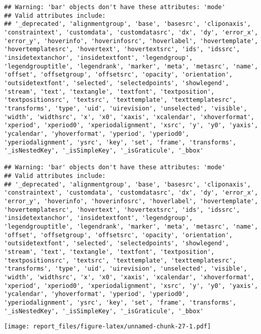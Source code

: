 \documentclass[
]{article}
\begin{document}
\begin{verbatim}
## Warning: 'bar' objects don't have these attributes: 'mode'
## Valid attributes include:
## '_deprecated', 'alignmentgroup', 'base', 'basesrc', 'cliponaxis', 'constraintext', 'customdata', 'customdatasrc', 'dx', 'dy', 'error_x', 'error_y', 'hoverinfo', 'hoverinfosrc', 'hoverlabel', 'hovertemplate', 'hovertemplatesrc', 'hovertext', 'hovertextsrc', 'ids', 'idssrc', 'insidetextanchor', 'insidetextfont', 'legendgroup', 'legendgrouptitle', 'legendrank', 'marker', 'meta', 'metasrc', 'name', 'offset', 'offsetgroup', 'offsetsrc', 'opacity', 'orientation', 'outsidetextfont', 'selected', 'selectedpoints', 'showlegend', 'stream', 'text', 'textangle', 'textfont', 'textposition', 'textpositionsrc', 'textsrc', 'texttemplate', 'texttemplatesrc', 'transforms', 'type', 'uid', 'uirevision', 'unselected', 'visible', 'width', 'widthsrc', 'x', 'x0', 'xaxis', 'xcalendar', 'xhoverformat', 'xperiod', 'xperiod0', 'xperiodalignment', 'xsrc', 'y', 'y0', 'yaxis', 'ycalendar', 'yhoverformat', 'yperiod', 'yperiod0', 'yperiodalignment', 'ysrc', 'key', 'set', 'frame', 'transforms', '_isNestedKey', '_isSimpleKey', '_isGraticule', '_bbox'

## Warning: 'bar' objects don't have these attributes: 'mode'
## Valid attributes include:
## '_deprecated', 'alignmentgroup', 'base', 'basesrc', 'cliponaxis', 'constraintext', 'customdata', 'customdatasrc', 'dx', 'dy', 'error_x', 'error_y', 'hoverinfo', 'hoverinfosrc', 'hoverlabel', 'hovertemplate', 'hovertemplatesrc', 'hovertext', 'hovertextsrc', 'ids', 'idssrc', 'insidetextanchor', 'insidetextfont', 'legendgroup', 'legendgrouptitle', 'legendrank', 'marker', 'meta', 'metasrc', 'name', 'offset', 'offsetgroup', 'offsetsrc', 'opacity', 'orientation', 'outsidetextfont', 'selected', 'selectedpoints', 'showlegend', 'stream', 'text', 'textangle', 'textfont', 'textposition', 'textpositionsrc', 'textsrc', 'texttemplate', 'texttemplatesrc', 'transforms', 'type', 'uid', 'uirevision', 'unselected', 'visible', 'width', 'widthsrc', 'x', 'x0', 'xaxis', 'xcalendar', 'xhoverformat', 'xperiod', 'xperiod0', 'xperiodalignment', 'xsrc', 'y', 'y0', 'yaxis', 'ycalendar', 'yhoverformat', 'yperiod', 'yperiod0', 'yperiodalignment', 'ysrc', 'key', 'set', 'frame', 'transforms', '_isNestedKey', '_isSimpleKey', '_isGraticule', '_bbox'
\end{verbatim}

\texttt{[image: report\_files/figure-latex/unnamed-chunk-27-1.pdf]}
\end{document}
